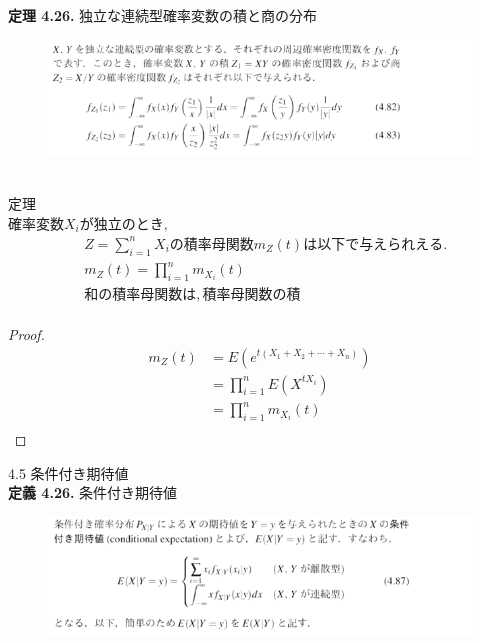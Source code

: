 \documentclass[dvipdfmx,10pt, a4j]{jarticle}
\theoremstyle{definition}
\begin{document}
\noindent
\textbf{定理 4.26.} 独立な連続型確率変数の積と商の分布\\
\begin{figure}[htbp]
\includegraphics[width=\linewidth]{D_11/teiri/4_26.png}
\end{figure}\\
定理\\
$確率変数 X_i が独立のとき,$\\
\begin{align*}
  &Z = \sum_{i=1}^{n}X_iの積率母関数m_Z(t)は以下で与えられえる.\\
  &m_Z(t) = \prod_{i=1}^{n}m_{X_i}(t)\\
  &和の積率母関数は, 積率母関数の積\\
\end{align*}
\begin{proof}
  \begin{align*}
    m_Z(t) &= E(e^{t(X_1 + X_2 + \cdots + X_n)})\\
    &=\prod_{i=1}^{n}E(X^{tX_i})\\
    &=\prod_{i=1}^{n}m_{X_i}(t)\\
  \end{align*}
\end{proof}

\noindent
{\LARGE 4.5 条件付き期待値}\\
\noindent
\textbf{定義 4.26.} 条件付き期待値\\
\begin{figure}[htbp]
\includegraphics[width=\linewidth]{D_11/teigi/4_26.png}
\end{figure}
\end{document}
